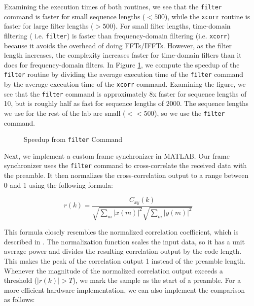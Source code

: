 \documentclass{article}
\begin{document}
\noindent Examining the execution times of both routines, we see that the \texttt{filter} command is faster for small sequence lengths ($< 500$), while the \texttt{xcorr} routine is faster for large filter lengths ($> 500$). For small filter lengths, time-domain filtering ( i.e. \texttt{filter}) is faster than frequency-domain filtering (i.e. \texttt{xcorr}) because it avoids the overhead of doing FFTs/IFFTs. However, as the filter length increases, the complexity increases faster for time-domain filters than it does for frequency-domain filters. In Figure \ref{fig::speedup}, we compute the speedup of the \texttt{filter} routine by dividing the average execution time of the \texttt{filter} command by the average execution time of the \texttt{xcorr} command. Examining the figure, we see that the \texttt{filter} command is approximately 8x faster for sequence lengths of 10, but is roughly half as fast for sequence lengths of 2000. The sequence lengths we use for the rest of the lab are small ($<< 500$), so we use the \texttt{filter} command.  

\begin{figure}[H]
	\centerline{}
	\caption{Speedup from \texttt{filter} Command}
	\label{fig::speedup}
\end{figure}

Next, we implement a custom frame synchronizer in MATLAB. Our frame synchronizer uses the \texttt{filter} command to cross-correlate the received data with the preamble. It then normalizes the cross-correlation output to a range between 0 and 1 using the following formula:

\begin{equation}
	r(k) = \frac{C_{xy}(k)}{\sqrt{\sum_m{|x(m)|^2}}\sqrt{\sum_m{|y(m)|^2}}}
\end{equation}

\noindent This formula closely resembles the normalized correlation coefficient, which is described in \cite{pearson_correlation_coefficient}. The normalization function scales the input data, so it has a unit average power and divides the resulting correlation output by the code length. This makes the peak of the correlation output 1 instead of the preamble length. Whenever the magnitude of the normalized correlation output exceeds a threshold ($|r(k)| > T$), we mark the sample as the start of a preamble. For a more efficient hardware implementation, we can also implement the comparison as follows:
\end{document}
